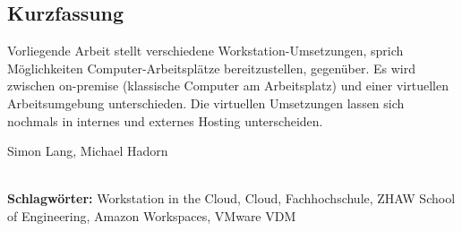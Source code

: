 
\subsection*{Kurzfassung}
Vorliegende Arbeit stellt verschiedene Workstation-Umsetzungen, sprich Möglichkeiten Computer-Arbeitsplätze bereitzustellen, gegenüber.
Es wird zwischen on-premise (klassische Computer am Arbeitsplatz) und einer virtuellen Arbeitsumgebung unterschieden.
Die virtuellen Umsetzungen lassen sich nochmals in internes und externes Hosting unterscheiden.

Simon Lang, Michael Hadorn


%
\mbox{}\\[0.5\baselineskip]\noindent
\textbf{Schlagwörter:} 
Workstation in the Cloud, Cloud, Fachhochschule, ZHAW School of Engineering, Amazon Workspaces, VMware VDM
